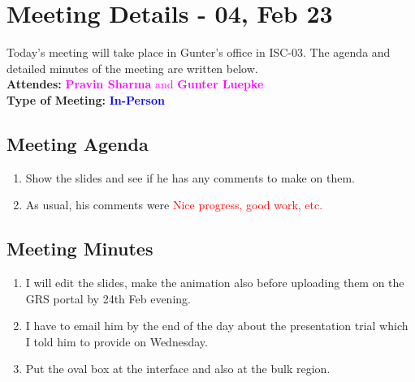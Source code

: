 \section{Meeting Details - 04, Feb 23}
\label{chap:Meeting_04}
Today's meeting will take place in Gunter's office in ISC-03. The agenda and detailed minutes of the meeting are written below.
\\ \textbf{Attendes:}
\textcolor{magenta}{\textbf{Pravin Sharma} and \textbf{Gunter Luepke}}
\\ \textbf{Type of Meeting:}
\textcolor{blue}{\textbf{In-Person} }
\subsection*{Meeting Agenda}
\begin{enumerate}
    \item Show the slides and see if he has any comments to make on them. 
    \item As usual, his comments were \textcolor{red}{Nice progress, good work, etc.}
\end{enumerate}
\subsection*{Meeting Minutes}
\begin{enumerate}
    \item I will edit the slides, make the animation also before uploading them on the GRS portal by 24th Feb evening.
    \item I have to email him by the end of the day about the presentation trial which I told him to provide on Wednesday.
    \item Put the oval box at the interface and also at the bulk region.
\end{enumerate}